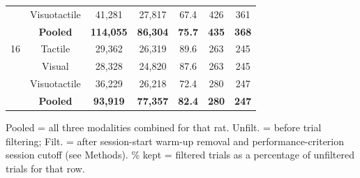 \begin{longtable}{lcccccc}
 & Visuotactile & 41,281 & 27,817 & 67.4 & 426 & 361 \\
\textbf{} & \textbf{Pooled} & \textbf{114,055} & \textbf{86,304} & \textbf{75.7} & \textbf{435} & \textbf{368} \\
16 & Tactile & 29,362 & 26,319 & 89.6 & 263 & 245 \\
 & Visual & 28,328 & 24,820 & 87.6 & 263 & 245 \\
 & Visuotactile & 36,229 & 26,218 & 72.4 & 280 & 247 \\
\textbf{} & \textbf{Pooled} & \textbf{93,919} & \textbf{77,357} & \textbf{82.4} & \textbf{280} & \textbf{247} \\
\end{longtable}
\vspace{4pt}
\par\noindent
\begin{minipage}{\linewidth}\small Pooled = all three modalities combined for that rat. Unfilt. = before trial filtering; Filt. = after session-start warm-up removal and performance-criterion session cutoff (see Methods). \% kept = filtered trials as a percentage of unfiltered trials for that row.\end{minipage}